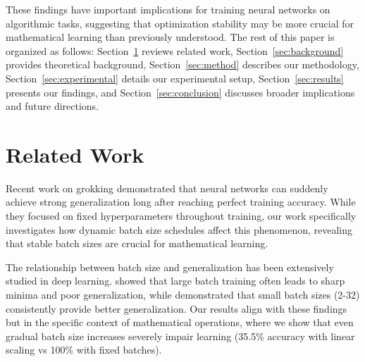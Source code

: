 \documentclass{article} %
\begin{document}
These findings have important implications for training neural networks on algorithmic tasks, suggesting that optimization stability may be more crucial for mathematical learning than previously understood. The rest of this paper is organized as follows: Section~\ref{sec:related} reviews related work, Section~\ref{sec:background} provides theoretical background, Section~\ref{sec:method} describes our methodology, Section~\ref{sec:experimental} details our experimental setup, Section~\ref{sec:results} presents our findings, and Section~\ref{sec:conclusion} discusses broader implications and future directions.

\section{Related Work}
\label{sec:related}







Recent work on grokking \citep{power2022grokking} demonstrated that neural networks can suddenly achieve strong generalization long after reaching perfect training accuracy. While they focused on fixed hyperparameters throughout training, our work specifically investigates how dynamic batch size schedules affect this phenomenon, revealing that stable batch sizes are crucial for mathematical learning.

The relationship between batch size and generalization has been extensively studied in deep learning. \citet{Keskar2016OnLT} showed that large batch training often leads to sharp minima and poor generalization, while \citet{Masters2018RevisitingSB} demonstrated that small batch sizes (2-32) consistently provide better generalization. Our results align with these findings but in the specific context of mathematical operations, where we show that even gradual batch size increases severely impair learning (35.5\% accuracy with linear scaling vs 100\% with fixed batches).
\end{document}
